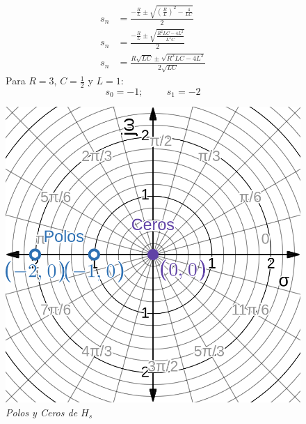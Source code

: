 \documentclass[12pt,a4paper]{report}
\begin{document}
\begin{enumerate}[label=\alph*)]
    \noindent
    \begin{figure}[h]
      \centering
      \begin{minipage}[h]{0.4\textwidth}
        \begin{align*}
          s_n &= \frac{-\frac{R}{L} \pm \sqrt{\left(\frac{R}{L}\right)^2 - \frac{4}{LC}}}{2}\\[6pt]
          s_n &= \frac{-\frac{R}{L} \pm \sqrt{\frac{R^2LC - 4L^2}{L^3C}}}{2}\\[6pt]
          s_n &= \frac{R\sqrt{LC} \pm \sqrt{R^2LC - 4L^2}}{2\sqrt{LC}}
        \end{align*}
        Para $R = 3$, $C = \frac{1}{2}$ y $L = 1$:
        \begin{equation*}
          s_0 = -1; \hspace{1cm}s_1 = -2
        \end{equation*}
      \end{minipage}
      \begin{minipage}[h]{0.4\textwidth}
        \centering
        \includegraphics[width=1\textwidth]{./images/ej4.6.png}
        \textit{Polos y Ceros de $H_s$}
      \end{minipage}
    \end{figure}
    

\end{enumerate}
\end{document}
